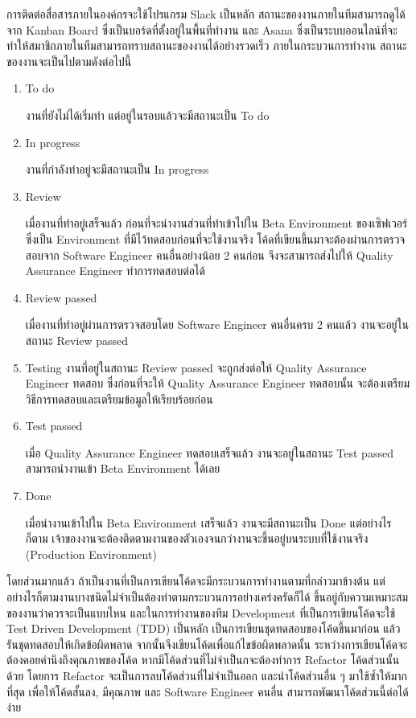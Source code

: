 การติดต่อสื่อสารภายในองค์กรจะใช้โปรแกรม Slack เป็นหลัก สถานะของงานภายในทีมสามารถดูได้จาก Kanban Board ซึ่งเป็นบอร์ดที่ตั้งอยู่ในพื้นที่ทำงาน และ Asana ซึ่งเป็นระบบออนไลน์ที่จะทำให้สมาชิกภายในทีมสามารถทราบสถานะของงานได้อย่างรวดเร็ว ภายในกระบวนการทำงาน สถานะของงานจะเป็นไปตามดังต่อไปนี้

\begin{enumerate}
	\item To do
	
	งานที่ยังไม่ได้เริ่มทำ แต่อยู่ในรอบแล้วจะมีสถานะเป็น To do
	
	\item In progress
	
	งานที่กำลังทำอยู่จะมีสถานะเป็น In progress
	
	\item Review
	
	เมื่องานที่ทำอยู่เสร็จแล้ว ก่อนที่จะนำงานส่วนที่ทำเข้าไปใน Beta Environment ของเซิฟเวอร์ ซึ่งเป็น Environment ที่มีไว้ทดสอบก่อนที่จะใช้งานจริง โค้ดที่เขียนขึ้นมาจะต้องผ่านการตรวจสอบจาก Software Engineer คนอื่นอย่างน้อย 2 คนก่อน จึงจะสามารถส่งไปให้ Quality Assurance Engineer ทำการทดสอบต่อได้
	
	\item Review passed
	
	เมื่องานที่ทำอยู่ผ่านการตรวจสอบโดย Software Engineer คนอื่นครบ 2 คนแล้ว งานจะอยู่ในสถานะ Review passed 
	
	\item Testing
	งานที่อยู่ในสถานะ Review passed จะถูกส่งต่อให้ Quality Assurance Engineer ทดสอบ ซึ่งก่อนที่จะให้ Quality Assurance Engineer ทดสอบนั้น จะต้องเตรียมวิธีการทดสอบและเตรียมข้อมูลให้เรียบร้อยก่อน
	
	\item Test passed
	
	เมื่อ Quality Assurance Engineer ทดสอบเสร็จแล้ว งานจะอยู่ในสถานะ Test passed สามารถนำงานเข้า Beta Environment ได้เลย
	
	\item Done
	
	เมื่อนำงานเข้าไปใน Beta Environment เสร็จแล้ว งานจะมีสถานะเป็น Done แต่อย่างไรก็ตาม เจ้าของงานจะต้องติดตามงานของตัวเองจนกว่างานจะขึ้นอยู่บนระบบที่ใช้งานจริง (Production Environment)
\end{enumerate}

โดยส่วนมากแล้ว ถ้าเป็นงานที่เป็นการเขียนโค้ดจะมีกระบวนการทำงานตามที่กล่าวมาข้างต้น แต่อย่างไรก็ตามงานบางชนิดไม่จำเป็นต้องทำตามกระบวนการอย่างเคร่งครัดก็ได้ ขึ้นอยู่กับความเหมาะสมของงานว่าควรจะเป็นแบบไหน และในการทำงานของทีม Development ที่เป็นการเขียนโค้ดจะใช้ Test Driven Development (TDD) เป็นหลัก เป็นการเขียนชุดทดสอบของโค้ดขึ้นมาก่อน แล้วรันชุดทดสอบให้เกิดข้อผิดพลาด จากนั้นจึงเขียนโค้ดเพื่อแก้ไขข้อผิดพลาดนั้น ระหว่างการเขียนโค้ดจะต้องคอยคำนึงถึงคุณภาพของโค้ด หากมีโค้ดส่วนที่ไม่จำเป็นกจะต้องทำการ Refactor โค้ดส่วนนั้นด้วย โดยการ Refactor จะเป็นการลบโค้ดส่วนที่ไม่จำเป็นออก และนำโค้ดส่วนอื่น ๆ มาใช้ซ้ำให้มากที่สุด เพื่อให้โค้ดสั้นลง, มีคุณภาพ และ Software Engineer คนอื่น สามารถพัฒนาโค้ดส่วนนี้ต่อได้ง่าย

